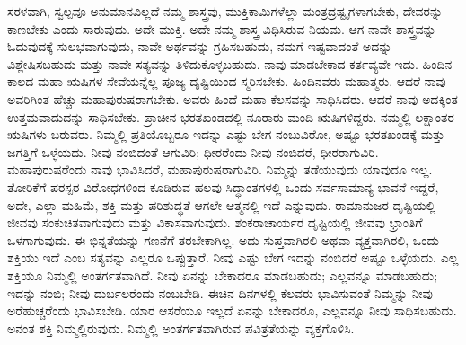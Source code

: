 ಸರಳವಾಗಿ, ಸ್ವಲ್ಪವೂ ಅನುಮಾನವಿಲ್ಲದೆ ನಮ್ಮ ಶಾಸ್ತ್ರವು, ಮುಕ್ತಿಕಾಮಿಗಳೆಲ್ಲಾ ಮಂತ್ರದ್ರಷ್ಟೃಗಳಾಗಬೇಕು, ದೇವರನ್ನು ಕಾಣಬೇಕು ಎಂದು ಸಾರುವುದು. ಅದೇ ಮುಕ್ತಿ. ಅದೇ ನಮ್ಮ ಶಾಸ್ತ್ರ ವಿಧಿಸಿರುವ ನಿಯಮ. ಆಗ ನಾವೇ ಶಾಸ್ತ್ರವನ್ನು ಓದುವುದಕ್ಕೆ ಸುಲಭವಾಗುವುದು, ನಾವೇ ಅರ್ಥವನ್ನು ಗ್ರಹಿಸಬಹುದು, ನಮಗೆ ಇಷ್ಟವಾದಂತೆ ಅದನ್ನು ವಿಶ್ಲೇಷಿಸಬಹುದು ಮತ್ತು ನಾವೇ ಸತ್ಯವನ್ನು ತಿಳಿದುಕೊಳ್ಳಬಹುದು. ನಾವು ಮಾಡಬೇಕಾದ ಕರ್ತವ್ಯವೇ ಇದು. ಹಿಂದಿನ ಕಾಲದ ಮಹಾ ಋಷಿಗಳ ಸೇವೆಯನ್ನೆಲ್ಲ ಪೂಜ್ಯ ದೃಷ್ಟಿಯಿಂದ ಸ್ಮರಿಸಬೇಕು. ಹಿಂದಿನವರು ಮಹಾತ್ಮರು. ಆದರೆ ನಾವು ಅವರಿಗಿಂತ ಹೆಚ್ಚು ಮಹಾಪುರುಷರಾಗಬೇಕು. ಅವರು ಹಿಂದೆ ಮಹಾ ಕೆಲಸವನ್ನು ಸಾಧಿಸಿದರು. ಆದರೆ ನಾವು ಅದಕ್ಕಿಂತ ಉತ್ತಮವಾದುದನ್ನು ಸಾಧಿಸಬೇಕು. ಪ್ರಾಚೀನ ಭರತಖಂಡದಲ್ಲಿ ನೂರಾರು ಮಂದಿ ಋಷಿಗಳಿದ್ದರು. ನಮ್ಮಲ್ಲಿ ಲಕ್ಷಾಂತರ ಋಷಿಗಳು ಬರುವರು. ನಿಮ್ಮಲ್ಲಿ ಪ್ರತಿಯೊಬ್ಬರೂ ಇದನ್ನು ಎಷ್ಟು ಬೇಗ ನಂಬುವಿರೋ, ಅಷ್ಟೂ ಭರತಖಂಡಕ್ಕೆ ಮತ್ತು ಜಗತ್ತಿಗೆ ಒಳ್ಳೆಯದು. ನೀವು ನಂಬಿದಂತೆ ಆಗುವಿರಿ; ಧೀರರೆಂದು ನೀವು ನಂಬಿದರೆ, ಧೀರರಾಗುವಿರಿ. ಮಹಾಪುರುಷರೆಂದು ನಾವು ಭಾವಿಸಿದರೆ, ಮಹಾಪುರುಷರಾಗುವಿರಿ. ನಿಮ್ಮನ್ನು ತಡೆಯುವುದು ಯಾವುದೂ ಇಲ್ಲ. ತೋರಿಕೆಗೆ ಪರಸ್ಪರ ವಿರೋಧಗಳಿಂದ ಕೂಡಿರುವ ಹಲವು ಸಿದ್ಧಾಂತಗಳಲ್ಲಿ ಒಂದು ಸರ್ವಸಾಮಾನ್ಯ ಭಾವನೆ ಇದ್ದರೆ, ಅದೇ, ಎಲ್ಲಾ ಮಹಿಮೆ, ಶಕ್ತಿ ಮತ್ತು ಪರಿಶುದ್ಧತೆ ಆಗಲೇ ಆತ್ಮನಲ್ಲಿ ಇದೆ ಎನ್ನುವುದು. ರಾಮಾನುಜರ ದೃಷ್ಟಿಯಲ್ಲಿ ಜೀವವು ಸಂಕುಚಿತವಾಗುವುದು ಮತ್ತು ವಿಕಾಸವಾಗುವುದು. ಶಂಕರಾಚಾರ್ಯರ ದೃಷ್ಟಿಯಲ್ಲಿ ಜೀವವು ಭ್ರಾಂತಿಗೆ ಒಳಗಾಗುವುದು. ಈ ಭಿನ್ನತೆಯನ್ನು ಗಣನೆಗೆ ತರಬೇಕಾಗಿಲ್ಲ. ಅದು ಸುಪ್ತವಾಗಿರಲಿ ಅಥವಾ ವ್ಯಕ್ತವಾಗಿರಲಿ, ಒಂದು ಶಕ್ತಿಯು ಇದೆ ಎಂಬ ಸತ್ಯವನ್ನು ಎಲ್ಲರೂ ಒಪ್ಪುತ್ತಾರೆ. ನೀವು ಎಷ್ಟು ಬೇಗ ಇದನ್ನು ನಂಬಿದರೆ ಅಷ್ಟೂ ಒಳ್ಳೆಯದು. ಎಲ್ಲ ಶಕ್ತಿಯೂ ನಿಮ್ಮಲ್ಲಿ ಅಂತರ್ಗತವಾಗಿದೆ. ನೀವು ಏನನ್ನು ಬೇಕಾದರೂ ಮಾಡಬಹುದು; ಎಲ್ಲವನ್ನೂ ಮಾಡಬಹುದು; ಇದನ್ನು ನಂಬಿ; ನೀವು ದುರ್ಬಲರೆಂದು ನಂಬಬೇಡಿ. ಈಚಿನ ದಿನಗಳಲ್ಲಿ ಕೆಲವರು ಭಾವಿಸುವಂತೆ ನಿಮ್ಮನ್ನು ನೀವು ಅರೆಹುಚ್ಚರೆಂದು ಭಾವಿಸಬೇಡಿ. ಯಾರ ಆಸರೆಯೂ ಇಲ್ಲದೆ ಏನನ್ನು ಬೇಕಾದರೂ, ಎಲ್ಲವನ್ನೂ ನೀವು ಸಾಧಿಸಬಹುದು. ಅನಂತ ಶಕ್ತಿ ನಿಮ್ಮಲ್ಲಿರುವುದು. ನಿಮ್ಮಲ್ಲಿ ಅಂತರ್ಗತವಾಗಿರುವ ಪವಿತ್ರತೆಯನ್ನು ವ್ಯಕ್ತಗೊಳಿಸಿ.


